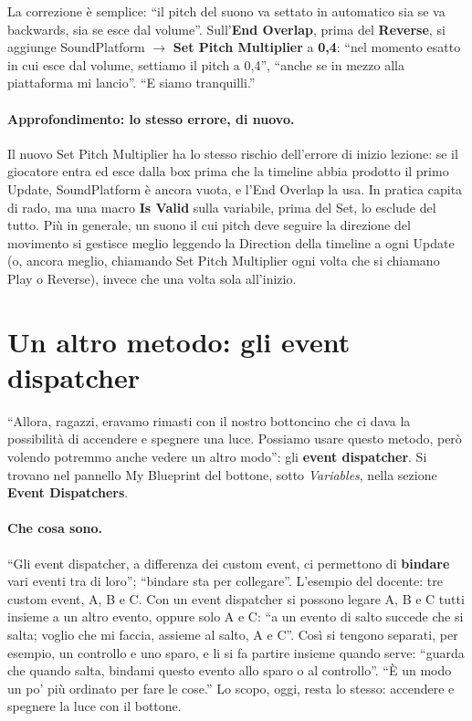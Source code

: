 La correzione è semplice: ``il pitch del suono va settato in automatico sia se va
backwards, sia se esce dal volume''. Sull'\textbf{End Overlap}, prima del
\textbf{Reverse}, si aggiunge SoundPlatform $\rightarrow$ \textbf{Set Pitch Multiplier}
a \textbf{0,4}: ``nel momento esatto in cui esce dal volume, settiamo il pitch a 0,4'',
``anche se in mezzo alla piattaforma mi lancio''. ``E siamo tranquilli.''

\paragraph{Approfondimento: lo stesso errore, di nuovo.} Il nuovo Set Pitch Multiplier
ha lo stesso rischio dell'errore di inizio lezione: se il giocatore entra ed esce dalla
box prima che la timeline abbia prodotto il primo Update, SoundPlatform è ancora vuota,
e l'End Overlap la usa. In pratica capita di rado, ma una macro \textbf{Is Valid} sulla
variabile, prima del Set, lo esclude del tutto. Più in generale, un suono il cui pitch
deve seguire la direzione del movimento si gestisce meglio leggendo la Direction della
timeline a ogni Update (o, ancora meglio, chiamando Set Pitch Multiplier ogni volta che
si chiamano Play o Reverse), invece che una volta sola all'inizio.

\section{Un altro metodo: gli event dispatcher}
\label{ue7:sec:dispatcher}

``Allora, ragazzi, eravamo rimasti con il nostro bottoncino che ci dava la possibilità di
accendere e spegnere una luce. Possiamo usare questo metodo, però volendo potremmo anche
vedere un altro modo'': gli \textbf{event dispatcher}. Si trovano nel pannello My
Blueprint del bottone, sotto \emph{Variables}, nella sezione \textbf{Event Dispatchers}.

\paragraph{Che cosa sono.} ``Gli event dispatcher, a differenza dei custom event, ci
permettono di \textbf{bindare} vari eventi tra di loro''; ``bindare sta per
collegare''. L'esempio del docente: tre custom event, A, B e C. Con un event dispatcher
si possono legare A, B e C tutti insieme a un altro evento, oppure solo A e C: ``a un
evento di salto succede che si salta; voglio che mi faccia, assieme al salto, A e C''.
Così si tengono separati, per esempio, un controllo e uno sparo, e li si fa partire
insieme quando serve: ``guarda che quando salta, bindami questo evento allo sparo o al
controllo''. ``È un modo un po' più ordinato per fare le cose.'' Lo scopo, oggi, resta lo
stesso: accendere e spegnere la luce con il bottone.

